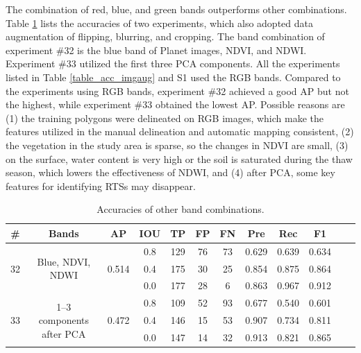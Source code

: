 \documentclass[authoryear,preprint,review,12pt]{elsarticle}
\begin{document}
The combination of red, blue, and green bands outperforms other combinations.
Table \ref{table_acc_otherbands} lists the accuracies of two experiments, which also adopted data augmentation of flipping, blurring, and cropping. The band combination of experiment \#32 is the blue band of Planet images, NDVI, and NDWI. Experiment \#33 utilized the first three PCA components. All the experiments listed in Table \ref{table_acc_imgaug} and S1 used the RGB bands. Compared to the experiments using RGB bands, experiment \#32 achieved a good AP but not the highest, while experiment \#33 obtained the lowest AP. Possible reasons are (1) the training polygons were delineated on RGB images, which make the features utilized in the manual delineation and automatic mapping consistent, (2) the vegetation in the study area is sparse, so the changes in NDVI are small, (3) on the surface, water content is very high or the soil is saturated during the thaw season, which lowers the effectiveness of NDWI, and (4) after PCA, some key features for identifying RTSs may disappear. 

\begin{table}[ht]
\footnotesize
\caption{Accuracies of other band combinations.}
\label{table_acc_otherbands}
\begin{tabular}{c c c c  c ccc c c c c}
\toprule
\textbf{\#}&\textbf{Bands}&\textbf{AP}&\textbf{IOU}&\textbf{TP}&\textbf{FP}&\textbf{FN}&\textbf{Pre}&\textbf{Rec}&\textbf{F1}\\
\midrule

\multirow{3}{*}{32} &  \multirow{3}{3cm}{Blue, NDVI, NDWI} & \multirow{3}{*}{0.514}  &0.8&129&76&73&0.629 &0.639 &0.634   \\
 &  &  &0.4&175&30&25&0.854 &0.875 &0.864  \\
 &  &  &0.0&177&28&6&0.863 &0.967 &0.912   \\
 
\midrule

\multirow{3}{*}{33} &  \multirow{3}{3cm}{1--3 components after PCA} & \multirow{3}{*}{0.472} &0.8&109&52&93&0.677 &0.540 &0.601  \\
 &  &  &0.4&146&15&53&0.907 &0.734 &0.811  \\
 &  & &0.0&147&14&32&0.913 &0.821 &0.865  \\

\bottomrule
\end{tabular}

\end{table}
\end{document}
